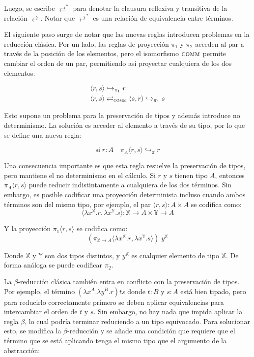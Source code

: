 Luego, se escribe $\rightleftarrows^*$ para denotar la clausura reflexiva y transitiva de la relación $\rightleftarrows$.
Notar que $\rightleftarrows^*$ es una relación de equivalencia entre términos.

El siguiente paso surge de notar que las nuevas reglas introducen problemas en la reducción clásica.
Por un lado, las reglas de proyección $\pi_1$ y $\pi_2$ acceden al par a través de la posición de los elementos, pero el isomorfismo $\textsc{comm}$ permite cambiar el orden de un par, permitiendo así proyectar cualquiera de los dos elementos:

\begin{align*}
	\langle r, s \rangle& \hookrightarrow_{\pi_1} r \\
	\langle r, s \rangle& \rightleftarrows_{\textsc{comm}} \langle s, r \rangle \hookrightarrow_{\pi_1} s
\end{align*}

Esto supone un problema para la preservación de tipos y además introduce no determinismo.
La solución es acceder al elemento a través de su tipo, por lo que se define una nueva regla:

\[ \text{si} \; r:A \quad \pi_A \langle r, s \rangle \hookrightarrow_{\pi} r \]

Una consecuencia importante es que esta regla resuelve la preservación de tipos, pero mantiene el no determinismo en el cálculo.
Si $r$ y $s$ tienen tipo $A$, entonces $\pi_A \langle r, s \rangle$ puede reducir indistintamente a cualquiera de los dos términos.
Sin embargo, es posible codificar una proyección determinista incluso cuando ambos términos son del mismo tipo, por ejemplo, el par $\langle r, s \rangle: A \times A$
se codifica como:
\[ \langle \lambda x^\mathbb{X}.r, \lambda x^\mathbb{Y}.s \rangle : \mathbb{X} \rightarrow A \times \mathbb{Y} \rightarrow A \]

Y la proyección $\pi_1 \langle r, s \rangle$ se codifica como:
\[ (\pi_{\mathbb{X} \rightarrow A} \langle \lambda x^\mathbb{X}.r, \lambda x^\mathbb{Y}.s \rangle)\; y^\mathbb{X} \]

Donde $\mathbb{X}$ y $\mathbb{Y}$ son dos tipos distintos, y $y^\mathbb{X}$ es cualquier elemento de tipo $\mathbb{X}$.
De forma análoga se puede codificar $\pi_2$.


La $\beta$-reducción clásica también entra en conflicto con la preservación de tipos.
Por ejemplo, el término $(\lambda x^A . \lambda y^B . r)ts$ donde $t:B$ y $s:A$ está bien tipado, pero para reducirlo correctamente primero se deben aplicar equivalencias para intercambiar el orden de $t$ y $s$.
Sin embargo, no hay nada que impida aplicar la regla $\beta$, lo cual podría terminar reduciendo a un tipo equivocado.
Para solucionar esto, se modifica la $\beta$-reducción y se añade una condición que requiere que el término que se está aplicando tenga el mismo tipo que el argumento de la abstracción:

